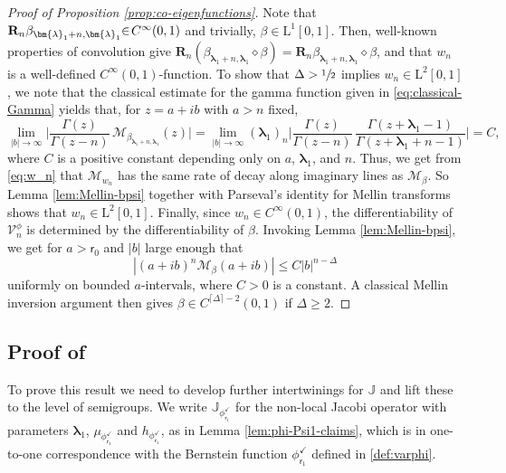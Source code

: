\documentclass[JEP,XML,SOM,Unicode]{cedram}
\theoremstyle{plain}
\theoremstyle{definition}
\newcommand{\V}{\mathcal{V}}
\newcommand{\calM}{\mathcal{M}}
\newcommand{\Rc}{\mathbf{R}}
\newcommand{\calJ}{\mathds{J}}
\newcommand{\Leb}{\mathrm{L}}
\newcommand{\lam}{{\bm{\lambda}_1}}
\newcommand{\tet}{{\mathsf{r}_0}}
\newcommand{\vat}{{\mathsf{r}_1}}
\renewcommand{\varphi}{{\phi_{\vat}^{\checkmark}}}
\newcommand{\gab}[1][\lam,\mo]{{\beta_{#1}}}
\let\mo\mu
\let\bpsi\beta
\begin{document}
\begin{proof}[Proof of Proposition \ref{prop:co-eigenfunctions}]
Note that $\Rc_n \gab[\lam+n,\lam]\mkern-5mu\in\!C^\infty(0,1)$ and trivially, \hbox{$\bpsi\!\in\!\Leb^1[0,1]$}. Then, well-known properties of convolution give $\Rc_n\left( \gab[\lam+n,\lam] \diamond \bpsi\right) = \Rc_n \gab[\lam+n,\lam] \diamond \bpsi$, and that $w_n$ is a well-defined $C^\infty(0,1)$-function. To show that $\Delta > \sfrac{1}{2}$ implies $w_n \in \Leb^2[0,1]$, we note that the classical estimate for the gamma function given in \eqref{eq:classical-Gamma} yields that, for $z = a+ib$ with $a > n$ fixed,
\begin{equation*}
\lim_{|b| \to \infty} \biggl| \frac{\Gamma(z)}{\Gamma(z-n)}\, \calM_{\gab[\lam+n,\lam]}(z) \biggr| = \lim_{|b| \to \infty} (\lam)_n \biggl| \frac{\Gamma(z)}{\Gamma(z-n)}\,\frac{\Gamma(z+\lam-1)}{\Gamma(z+\lam+n-1)} \biggr| = C,
\end{equation*}
where $C$ is a positive constant depending only on $a$, $\lam$, and $n$. Thus, we get from \eqref{eq:w_n} that $\calM_{w_n}$ has the same rate of decay along imaginary lines as $\calM_{\bpsi}$. So Lemma \ref{lem:Mellin-bpsi} together with Parseval's identity for Mellin transforms shows that $w_n \in \Leb^2[0,1]$. Finally, since $w_n \in C^\infty(0,1)$, the differentiability of $\V_n^\phi$ is determined by the differentiability of $\bpsi$. Invoking Lemma \ref{lem:Mellin-bpsi}, we get for $a > \tet$ and $|b|$ large enough that
\begin{equation*}
\left| (a+ib)^n \calM_{\bpsi}(a+ib) \right| \leq C |b|^{n-\Delta}
\end{equation*}
uniformly on bounded $a$-intervals, where $C > 0$ is a constant.
A classical Mellin inversion argument then gives $\bpsi \in C^{\lceil \Delta \rceil - 2}(0,1)$
if $\Delta \ge 2$.
\end{proof}

\subsection{Proof of }

To prove this result we need to develop further inter\-twinings for $\calJ$ and lift these to the level of semigroups. We write $\calJ_\varphi$ for the non-local Jacobi operator with parameters $\lam$, $\mo_\varphi$ and $h_\varphi$, as in Lemma \ref{lem:phi-Psi1-claims}, which is in one-to-one correspondence with the Bernstein function $\varphi$ defined in \eqref{def:varphi}.
\end{document}
